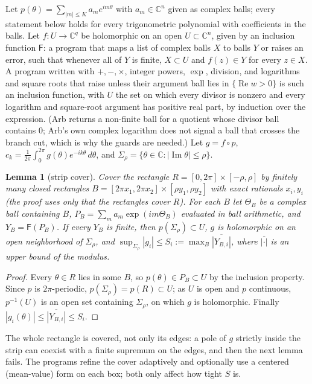 \documentclass[11pt]{article}
\newtheorem{lemma}{Lemma}[section]
\theoremstyle{definition}
\newcommand{\C}{\mathbb{C}}
\newcommand{\re}{\operatorname{Re}}
\newcommand{\im}{\operatorname{Im}}
\begin{document}
Let $p(\theta) = \sum_{|m| \le K} a_m e^{im\theta}$ with $a_m \in \C^n$ given as complex balls; every statement below holds for every trigonometric polynomial with coefficients in the balls. Let $f: U \to \C^q$ be holomorphic on an open $U \subset \C^n$, given by an inclusion function $\mathsf F$: a program that maps a list of complex balls $X$ to balls $Y$ or raises an error, such that whenever all of $Y$ is finite, $X \subset U$ and $f(z) \in Y$ for every $z \in X$. A program written with $+, -, \times$, integer powers, $\exp$, division, and logarithms and square roots that raise unless their argument ball lies in $\{\re w > 0\}$ is such an inclusion function, with $U$ the set on which every divisor is nonzero and every logarithm and square-root argument has positive real part, by induction over the expression. (Arb returns a non-finite ball for a quotient whose divisor ball contains $0$; Arb's own complex logarithm does not signal a ball that crosses the branch cut, which is why the guards are needed.) Let $g = f \circ p$, $c_k = \frac{1}{2\pi}\int_0^{2\pi} g(\theta) e^{-ik\theta}\,d\theta$, and $\Sigma_\rho = \{\theta \in \C : |\im\theta| \le \rho\}$.

\begin{lemma}[strip cover]\label{lem:strip}
Cover the rectangle $R = [0, 2\pi] \times [-\rho, \rho]$ by finitely many closed rectangles $B = [2\pi x_1, 2\pi x_2] \times [\rho y_1, \rho y_2]$ with exact rationals $x_i, y_i$ (the proof uses only that the rectangles cover $R$). For each $B$ let $\Theta_B$ be a complex ball containing $B$, $P_B = \sum_m a_m \exp(i m \Theta_B)$ evaluated in ball arithmetic, and $Y_B = \mathsf F(P_B)$. If every $Y_B$ is finite, then $p(\Sigma_\rho) \subset U$, $g$ is holomorphic on an open neighborhood of $\Sigma_\rho$, and $\sup_{\Sigma_\rho} |g_i| \le S_i := \max_B \overline{|Y_{B,i}|}$, where $\overline{|\cdot|}$ is an upper bound of the modulus.
\end{lemma}

\begin{proof}
Every $\theta \in R$ lies in some $B$, so $p(\theta) \in P_B \subset U$ by the inclusion property. Since $p$ is $2\pi$-periodic, $p(\Sigma_\rho) = p(R) \subset U$; as $U$ is open and $p$ continuous, $p^{-1}(U)$ is an open set containing $\Sigma_\rho$, on which $g$ is holomorphic. Finally $|g_i(\theta)| \le \overline{|Y_{B,i}|} \le S_i$.
\end{proof}

The whole rectangle is covered, not only its edges: a pole of $g$ strictly inside the strip can coexist with a finite supremum on the edges, and then the next lemma fails. The programs refine the cover adaptively and optionally use a centered (mean-value) form on each box; both only affect how tight $S$ is.
\end{document}
